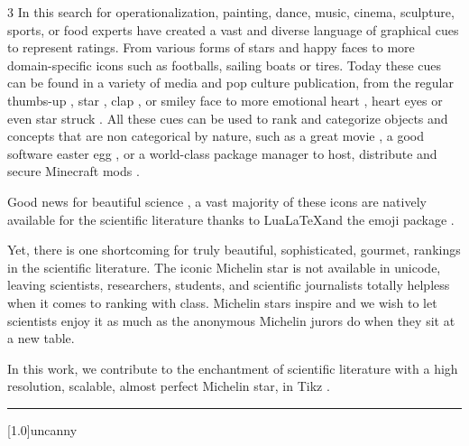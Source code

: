 \documentclass[11pt]{article}
\begin{document}
\begin{multicols}{3}
In this search for operationalization, painting, dance, music, cinema, sculpture, sports, or food experts have created a vast and diverse language of graphical cues to represent ratings. From various forms of stars and happy faces to more domain-specific icons such as footballs, sailing boats or tires. Today these cues can be found in a variety of media and pop culture publication, from the regular thumbs-up
, star , clap , or smiley face  to more emotional heart , heart eyes  or even star struck . All these cues can be used to rank and categorize objects and concepts that are non categorical by nature, such as a great movie , a good software easter egg , or a world-class package manager to host, distribute and secure Minecraft mods .

Good news for beautiful science \cite{dion1972beautiful}, a vast majority of these icons are natively available for the scientific literature thanks to Lua\LaTeX and the emoji package \cite{emoji}. 

Yet, there is one shortcoming for truly beautiful, sophisticated, gourmet, rankings in the scientific literature. The iconic Michelin star is not available in unicode, leaving scientists, researchers, students, and scientific journalists totally helpless when it comes to ranking with class. Michelin stars inspire \cite{bang2022does,ercan2024plate} and we wish to let scientists enjoy it as much as the anonymous Michelin jurors do when they sit at a new table.

In this work, we contribute to the enchantment of scientific literature with a high resolution, scalable, almost perfect Michelin star, in Tikz \cite{kottwitz2023latex}.



\begin{centering}
\vspace{3mm}

\rule[3pt]{2em}{0.7pt}

\vspace{2mm}

\large \scalebox{1.2}[1.0]{uncanny}
    
\end{centering}


\end{multicols}
\end{document}
